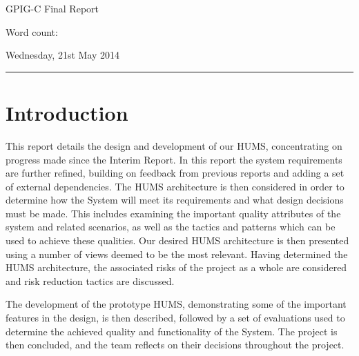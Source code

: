 \documentclass[10pt,a4paper]{article}
\begin{document}
\begin{center}
{\vspace*{-0.5cm}
\Huge GPIG-C Final Report}
\vspace*{0.2cm}

Word count: %
\vspace*{0.1cm}

Wednesday, 21st May 2014
\end{center}
\vspace*{0.4cm}
\hrule
\vspace*{0.4cm}

\section{Introduction}
\label{sec:intro}
This report details the design and development of our HUMS, concentrating on progress made since the Interim Report. In this report the system requirements are further refined, building on feedback from previous reports and adding a set of external dependencies. The HUMS architecture is then considered in order to determine how the System will meet its requirements and what design decisions must be made. This includes examining the important quality attributes of the system and related scenarios, as well as the tactics and patterns which can be used to achieve these qualities. Our desired HUMS architecture is then presented using a number of views deemed to be the most relevant. Having determined the HUMS architecture, the associated risks of the project as a whole are considered and risk reduction tactics are discussed.

The development of the prototype HUMS, demonstrating some of the important features in the design, is then described, followed by a set of evaluations used to determine the achieved quality and functionality of the System. The project is then concluded, and the team reflects on their decisions throughout the project.

\end{document}
